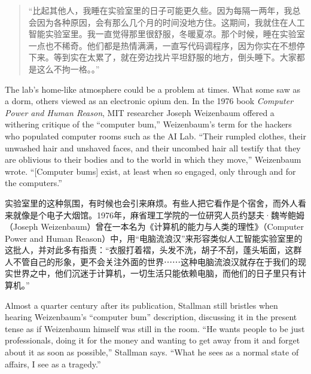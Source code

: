 \ifdefined\chs
\begin{quote}
``比起其他人，我睡在实验室里的日子可能更久些。因为每隔一两年，我总会因为各种原因，会有那么几个月的时间没地方住。这期间，我就住在人工智能实验室里。我一直觉得那里很舒服，冬暖夏凉。那个时候，睡在实验室一点也不稀奇。他们都是热情满满，一直写代码调程序，因为你实在不想停下来。等到实在太累了，就在旁边找片平坦舒服的地方，倒头睡下。大家都是这么不拘一格。。''
\end{quote}
\fi

\ifdefined\eng
The lab's home-like atmosphere could be a problem at times. What some saw as a dorm, others viewed as an electronic opium den. In the 1976 book \textit{Computer Power and Human Reason}, MIT researcher Joseph Weizenbaum offered a withering critique of the ``computer bum,'' Weizenbaum's term for the hackers who populated computer rooms such as the AI Lab. ``Their rumpled clothes, their unwashed hair and unshaved faces, and their uncombed hair all testify that they are oblivious to their bodies and to the world in which they move,'' Weizenbaum wrote. ``[Computer bums] exist, at least when so engaged, only through and for the computers.''
\fi

\ifdefined\chs
实验室里的这种氛围，有时候也会引来麻烦。有些人把它看作是个宿舍，而外人看来就像是个电子大烟馆。1976年，麻省理工学院的一位研究人员约瑟夫·魏岑鲍姆（Joseph Weizenbaum）曾在一本名为《计算机的能力与人类的理性》（Computer Power and Human Reason）中，用``电脑流浪汉''来形容类似人工智能实验室里的这批人，并对此多有指责：``衣服打着褶，头发不洗，胡子不刮，蓬头垢面，这群人不管自己的形象，更不会关注外面的世界⋯⋯这种电脑流浪汉就存在于我们的现实世界之中，他们沉迷于计算机，一切生活只能依赖电脑，而他们的日子里只有计算机。''
\fi

\ifdefined\eng
Almost a quarter century after its publication, Stallman still bristles when hearing Weizenbaum's ``computer bum'' description, discussing it in the present tense as if Weizenbaum himself was still in the room. ``He wants people to be just professionals, doing it for the money and wanting to get away from it and forget about it as soon as possible,'' Stallman says. ``What he sees as a normal state of affairs, I see as a tragedy.''
\fi

